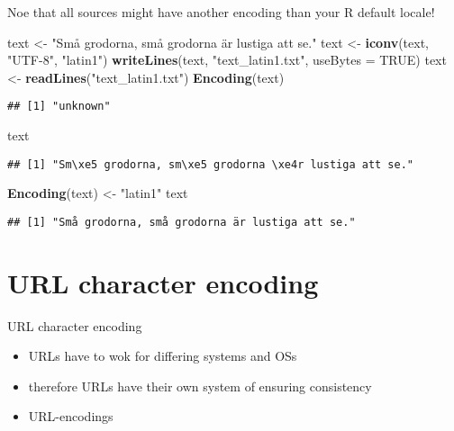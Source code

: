 \documentclass[ignorenonframetext,]{beamer}
\newenvironment{Shaded}{\begin{snugshade}}{\end{snugshade}}
\newcommand{\KeywordTok}[1]{\textcolor[rgb]{0.13,0.29,0.53}{\textbf{{#1}}}}
\newcommand{\DataTypeTok}[1]{\textcolor[rgb]{0.13,0.29,0.53}{{#1}}}
\newcommand{\StringTok}[1]{\textcolor[rgb]{0.31,0.60,0.02}{{#1}}}
\newcommand{\OtherTok}[1]{\textcolor[rgb]{0.56,0.35,0.01}{{#1}}}
\newcommand{\NormalTok}[1]{{#1}}
\providecommand{\tightlist}{%
  \setlength{\itemsep}{0pt}\setlength{\parskip}{0pt}}
\begin{document}
\begin{frame}[fragile]{Noe that all sources might have another encoding
than your R default locale!}

\begin{Shaded}
\begin{Highlighting}[]
\NormalTok{text <-}\StringTok{ "Små grodorna, små grodorna är lustiga att se."}
\NormalTok{text <-}\StringTok{ }\KeywordTok{iconv}\NormalTok{(text, }\StringTok{"UTF-8"}\NormalTok{, }\StringTok{"latin1"}\NormalTok{)}
\KeywordTok{writeLines}\NormalTok{(text, }\StringTok{"text_latin1.txt"}\NormalTok{, }\DataTypeTok{useBytes =} \OtherTok{TRUE}\NormalTok{)}
\NormalTok{text <-}\StringTok{ }\KeywordTok{readLines}\NormalTok{(}\StringTok{"text_latin1.txt"}\NormalTok{)}
\KeywordTok{Encoding}\NormalTok{(text)}
\end{Highlighting}
\end{Shaded}

\begin{verbatim}
## [1] "unknown"
\end{verbatim}

\begin{Shaded}
\begin{Highlighting}[]
\NormalTok{text}
\end{Highlighting}
\end{Shaded}

\begin{verbatim}
## [1] "Sm\xe5 grodorna, sm\xe5 grodorna \xe4r lustiga att se."
\end{verbatim}

\begin{Shaded}
\begin{Highlighting}[]
\KeywordTok{Encoding}\NormalTok{(text) <-}\StringTok{ "latin1"}
\NormalTok{text}
\end{Highlighting}
\end{Shaded}

\begin{verbatim}
## [1] "Små grodorna, små grodorna är lustiga att se."
\end{verbatim}

\end{frame}

\section{URL character encoding}\label{url-character-encoding}

\begin{frame}{URL character encoding}

\begin{itemize}
\tightlist
\item
  URLs have to wok for differing systems and OSs
\item
  therefore URLs have their own system of ensuring consistency
\item
  URL-encodings
\end{itemize}

\end{frame}
\end{document}
